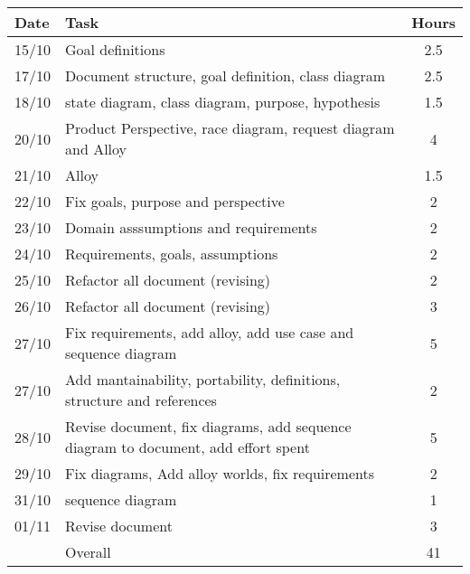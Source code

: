 \begin{table}[H]
\begin{tabularx}{\textwidth}{|l|X|c|}
\hline
\rowcolor[HTML]{C0C0C0} 
Date & Task & Hours\\ \hline
15/10 & Goal definitions & 2.5\\ \hline
17/10 & Document structure, goal definition, class diagram & 2.5\\ \hline
18/10 & state diagram, class diagram, purpose, hypothesis & 1.5\\ \hline
20/10 & Product Perspective, race diagram, request diagram and Alloy & 4\\ \hline
21/10 & Alloy & 1.5 \\ \hline
22/10 & Fix goals, purpose and perspective & 2\\ \hline
23/10 & Domain asssumptions and requirements & 2\\ \hline
24/10 & Requirements, goals, assumptions & 2\\ \hline
25/10 & Refactor all document (revising) & 2\\ \hline
26/10 & Refactor all document (revising) & 3\\ \hline
27/10 & Fix requirements, add alloy, add use case and sequence diagram & 5\\ \hline
27/10 & Add mantainability, portability, definitions, structure and references & 2\\ \hline
28/10 & Revise document, fix diagrams, add sequence diagram to document, add effort spent & 5\\ \hline
29/10 & Fix diagrams, Add alloy worlds, fix requirements & 2 \\ \hline
31/10 & sequence diagram & 1 \\ \hline
01/11 & Revise document & 3 \\ \hline 
\rowcolor[HTML]{C0C0C0} 
& Overall & 41\\ \hline
\end{tabularx}
\end{table}
